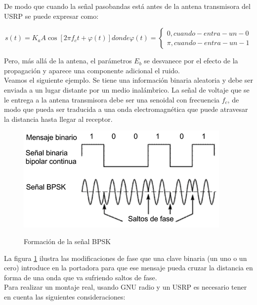 De modo que cuando la señal pasobandas está antes de la antena transmisora del USRP se puede expresar como: 

\begin{equation} \label{capcuatro_doce}
	 s(t)= K_aA\cos [2\pi f_ct+\varphi(t)] donde \varphi(t)= \begin{cases} 0, cuando- entra- un -0\\ \pi, cuando- entra- un -1 
	\end{cases}
\end{equation}

Pero, más allá de la antena, el parámetros $E_b$ se desvanece por el efecto de la propagación y aparece una componente adicional el ruido. \\

Veamos el siguiente ejemplo. Se tiene una  información binaria aleatoria y debe ser enviada a un lugar distante por un medio inalámbrico. La señal de voltaje que se le entrega a la antena transmisora debe ser una senoidal con frecuencia $f_c$, de modo que pueda ser traducida a una onda electromagnética que puede atravesar la distancia hasta llegar al receptor. \\

\begin{figure}[h!]
	\captionsetup{justification = raggedright, singlelinecheck = false}
	\caption{Formación de la señal BPSK} 
	\centering
	\includegraphics[scale=1]{Imagenes/BPSK-1.png}
	\label{fig:BPSK-1}
\end{figure}

La figura \ref{fig:BPSK-1} ilustra las modificaciones de fase que una clave binaria (un uno o un cero) introduce en la portadora para que ese mensaje pueda cruzar la distancia en forma de una onda que va sufriendo saltos de fase. \\

Para realizar un montaje real, usando GNU radio y un USRP es necesario tener en cuenta las siguientes consideraciones: \\


